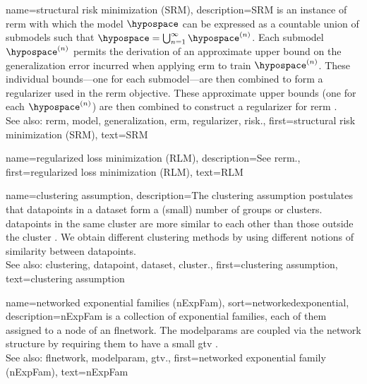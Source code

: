 {name={structural risk minimization (SRM)}, 
	description={SRM is an
		instance of \gls{rerm} with which the \gls{model} $\hypospace$ can be expressed 
		as a \gls{countable} union of submodels such that $\hypospace = \bigcup_{n=1}^{\infty} \hypospace^{(n)}$. 
		Each submodel $\hypospace^{(n)}$ permits the derivation of an approximate upper bound 
		on the \gls{generalization} error incurred when applying \gls{erm} to train $\hypospace^{(n)}$. 
		These individual bounds—one for each submodel—are then combined to form a \gls{regularizer} 
		used in the \gls{rerm} objective. 
        		These approximate upper bounds (one for each $\hypospace^{(n)}$) are then combined 
		to construct a \gls{regularizer} for \gls{rerm} \cite[Sec.\ 7.2]{ShalevMLBook}.
				\\
		See also: \gls{rerm}, \gls{model}, \gls{generalization}, \gls{erm}, \gls{regularizer}, \gls{risk}.},
	first={structural risk minimization (SRM)},
	text={SRM}
}

{name={regularized loss minimization (RLM)},
 	description={See \gls{rerm}.},
	first={regularized loss minimization (RLM)}, 
 	text={RLM}
}

{name={clustering assumption}, 
	description={The 
		\gls{clustering} assumption postulates that \glspl{datapoint} in a \gls{dataset} form a (small) number of 
		groups or \glspl{cluster}. \Glspl{datapoint} in the same \gls{cluster} are more similar to each 
		other than those outside the \gls{cluster} \cite{SemiSupervisedBook}. We obtain different 
		\gls{clustering} methods by using different notions of similarity between \glspl{datapoint}.
				\\
		See also: \gls{clustering}, \gls{datapoint}, \gls{dataset}, \gls{cluster}.},
	first={clustering assumption},
	text={clustering assumption} 
}

{name={networked exponential families (nExpFam)}, 
sort={networkedexponential}, 
	description={nExpFam is a collection of exponential 
		families, each of them assigned to a node of an \gls{flnetwork}. The \glspl{modelparam} are coupled 
	   	via the network structure by requiring them to have a small \gls{gtv} \cite{JungNetExp2020}.
	   		\\
		See also: \gls{flnetwork}, \gls{modelparam}, \gls{gtv}.},
	first={networked exponential family (nExpFam)},
	text={nExpFam} 
}

